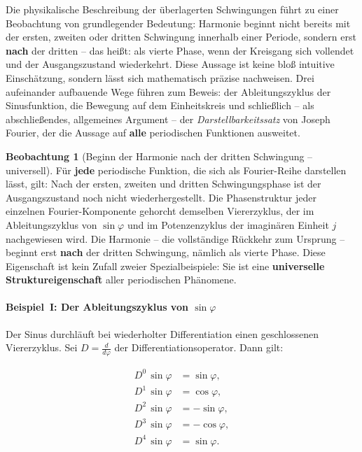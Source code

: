 ﻿\documentclass[a4paper,12pt]{article}
\theoremstyle{definition}
\newtheorem{observation}{Beobachtung}[section]
\begin{document}
Die physikalische Beschreibung der überlagerten Schwingungen führt zu einer Beobachtung
von grundlegender Bedeutung: Harmonie beginnt nicht bereits mit der ersten, zweiten oder
dritten Schwingung innerhalb einer Periode, sondern erst \textbf{nach} der dritten --
das heißt: als vierte Phase, wenn der Kreisgang sich vollendet und der Ausgangszustand
wiederkehrt. Diese Aussage ist keine bloß intuitive Einschätzung, sondern lässt sich
mathematisch präzise nachweisen. Drei aufeinander aufbauende Wege führen zum Beweis:
der Ableitungszyklus der Sinusfunktion, die Bewegung auf dem Einheitskreis und
schließlich -- als abschließendes, allgemeines Argument -- der
\textit{Darstellbarkeitssatz} von Joseph Fourier, der die Aussage auf
\textbf{alle} periodischen Funktionen ausweitet.

\begin{observation}[Beginn der Harmonie nach der dritten Schwingung -- universell]
	Für \textbf{jede} periodische Funktion, die sich als Fourier-Reihe darstellen
	lässt, gilt: Nach der ersten, zweiten und dritten Schwingungsphase ist der
	Ausgangszustand noch nicht wiederhergestellt. Die Phasenstruktur jeder einzelnen
	Fourier-Komponente gehorcht demselben Viererzyklus, der im Ableitungszyklus von
	$\sin\varphi$ und im Potenzenzyklus der imaginären Einheit $j$ nachgewiesen wird.
	Die Harmonie -- die vollständige Rückkehr zum Ursprung -- beginnt erst
	\textbf{nach} der dritten Schwingung, nämlich als vierte Phase. Diese Eigenschaft
	ist kein Zufall zweier Spezialbeispiele: Sie ist eine \textbf{universelle
	Struktureigenschaft} aller periodischen Phänomene.
\end{observation}

\paragraph{Beispiel~I: Der Ableitungszyklus von $\sin\varphi$}

Der Sinus durchläuft bei wiederholter Differentiation einen geschlossenen Viererzyklus.
Sei $D = \tfrac{d}{d\varphi}$ der Differentiationsoperator. Dann gilt:

\begin{align*}
	D^0\,\sin\varphi &= \sin\varphi, \\
	D^1\,\sin\varphi &= \cos\varphi, \\
	D^2\,\sin\varphi &= -\sin\varphi, \\
	D^3\,\sin\varphi &= -\cos\varphi, \\
	D^4\,\sin\varphi &= \sin\varphi.
\end{align*}
\end{document}

